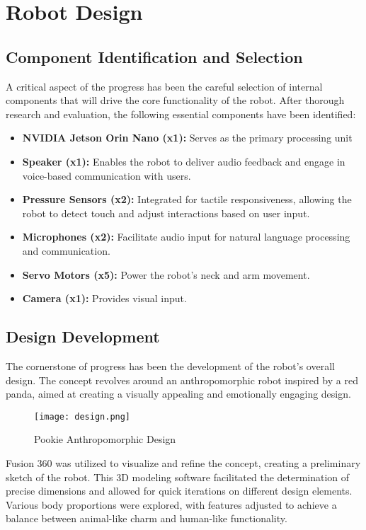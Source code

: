 \section{Robot Design}
\subsection{Component Identification and Selection}
A critical aspect of the progress has been the careful selection of internal components that will drive the core functionality of the robot. After thorough research and evaluation, the following essential components have been identified:
\begin{itemize}
    \item \textbf{NVIDIA Jetson Orin Nano (x1):} Serves as the primary processing unit
    \item \textbf{Speaker (x1):} Enables the robot to deliver audio feedback and engage in voice-based communication with users.
    \item \textbf{Pressure Sensors (x2):} Integrated for tactile responsiveness, allowing the robot to detect touch and adjust interactions based on user input.
    \item \textbf{Microphones (x2):} Facilitate audio input for natural language processing and communication.
    \item \textbf{Servo Motors (x5):} Power the robot's neck and arm movement.
    \item \textbf{Camera (x1):} Provides visual input.
\end{itemize}

\subsection{Design Development}
The cornerstone of progress has been the development of the robot's overall design. The concept revolves around an anthropomorphic robot inspired by a red panda, aimed at creating a visually appealing and emotionally engaging design.

\begin{figure}[ht]
    \centering
    \captionsetup{justification=centering}
    \texttt{[image: design.png]}
    \caption{Pookie Anthropomorphic Design}
    \label{fig:design}
\end{figure}

Fusion 360 was utilized to visualize and refine the concept, creating a preliminary sketch of the robot. This 3D modeling software facilitated the determination of precise dimensions and allowed for quick iterations on different design elements. Various body proportions were explored, with features adjusted to achieve a balance between animal-like charm and human-like functionality.

